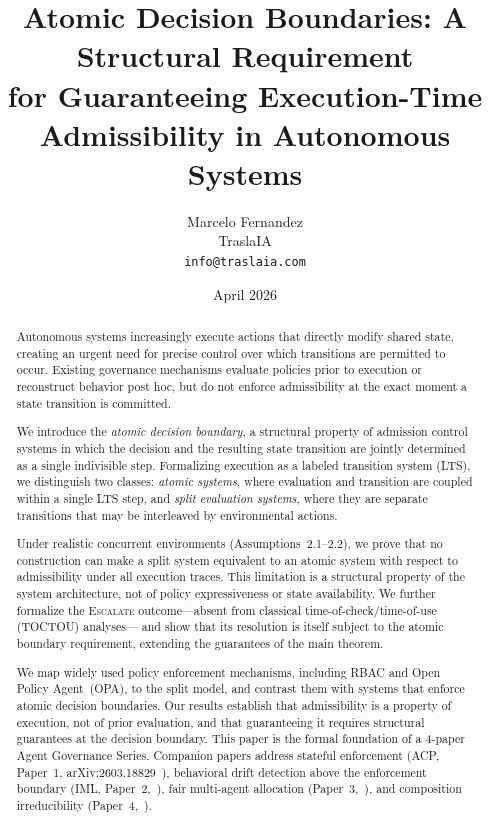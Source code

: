 \documentclass[11pt]{article}
\title{Atomic Decision Boundaries: A Structural Requirement\\
for Guaranteeing Execution-Time Admissibility in Autonomous Systems}
\author{Marcelo Fernandez\\
TraslaIA\\
\texttt{info@traslaia.com}}
\date{April 2026}
\theoremstyle{plain}
\theoremstyle{definition}
\theoremstyle{remark}
\newcommand{\Escalate}{\textsc{Escalate}}
\begin{document}
\maketitle

\begin{abstract}
Autonomous systems increasingly execute actions that directly modify shared state,
creating an urgent need for precise control over which transitions are permitted
to occur.  Existing governance mechanisms evaluate policies prior to execution or
reconstruct behavior post hoc, but do not enforce admissibility at the exact
moment a state transition is committed.

We introduce the \emph{atomic decision boundary}, a structural property of
admission control systems in which the decision and the resulting state
transition are jointly determined as a single indivisible step.  Formalizing
execution as a labeled transition system (LTS), we distinguish two classes:
\emph{atomic systems}, where evaluation and transition are coupled within a
single LTS step, and \emph{split evaluation systems}, where they are separate
transitions that may be interleaved by environmental actions.

Under realistic concurrent environments (Assumptions~2.1--2.2), we prove that
no construction can make a split system equivalent to an atomic system with
respect to admissibility under all execution traces.  This limitation is a
structural property of the system architecture, not of policy expressiveness
or state availability.  We further formalize the \Escalate{}
outcome---absent from classical time-of-check/time-of-use (TOCTOU) analyses---
and show that its resolution is itself subject to the atomic boundary
requirement, extending the guarantees of the main theorem.

We map widely used policy enforcement mechanisms, including RBAC and Open
Policy Agent~(OPA), to the split model, and contrast them with systems that
enforce atomic decision boundaries.  Our results establish that admissibility
is a property of execution, not of prior evaluation, and that guaranteeing it
requires structural guarantees at the decision boundary.
This paper is the formal foundation of a 4-paper Agent Governance Series.
Companion papers address stateful enforcement (ACP, Paper~1,
arXiv:2603.18829~\cite{acp26}), behavioral drift detection above the
enforcement boundary (IML, Paper~2,~\cite{iml26}), fair multi-agent allocation
(Paper~3,~\cite{fairgov26}), and composition irreducibility
(Paper~4,~\cite{fernandez2026comp}).
\end{abstract}
\end{document}
